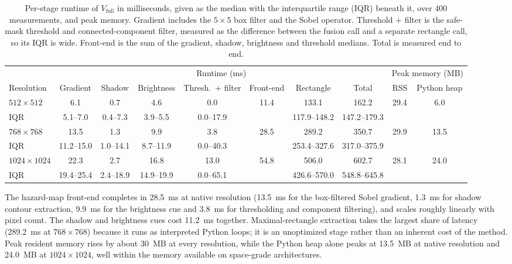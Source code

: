 \documentclass{article}
\begin{document}
\begin{table}[!htb]
  \caption{Per-stage runtime of $V_{\text{full}}$ in milliseconds, given as the median with the interquartile range (IQR) beneath it, over 400 measurements, and peak memory. Gradient includes the $5 \times 5$ box filter and the Sobel operator. Threshold + filter is the safe-mask threshold and connected-component filter, measured as the difference between the fusion call and a separate rectangle call, so its IQR is wide. Front-end is the sum of the gradient, shadow, brightness and threshold medians. Total is measured end to end.}
  \label{tab:runtime_breakdown}
  \centering
  \small
  \setlength{\tabcolsep}{3pt}
  \begin{tabular}{lccccccccc}
    \toprule
    & \multicolumn{7}{c}{Runtime (ms)} & \multicolumn{2}{c}{Peak memory (MB)} \\
    \cmidrule(lr){2-8} \cmidrule(lr){9-10}
    Resolution & Gradient & Shadow & Brightness & Thresh.\ + filter & Front-end & Rectangle & Total & RSS & Python heap \\
    \midrule
    $512 \times 512$ & 6.1 & 0.7 & 4.6 & 0.0 & 11.4 & 133.1 & 162.2 & 29.4 & 6.0 \\
    {\footnotesize\quad IQR} & {\footnotesize 5.1--7.0} & {\footnotesize 0.4--7.3} & {\footnotesize 3.9--5.5} & {\footnotesize 0.0--17.9} & & {\footnotesize 117.9--148.2} & {\footnotesize 147.2--179.3} & & \\
    $768 \times 768$ & 13.5 & 1.3 & 9.9 & 3.8 & 28.5 & 289.2 & 350.7 & 29.9 & 13.5 \\
    {\footnotesize\quad IQR} & {\footnotesize 11.2--15.0} & {\footnotesize 1.0--14.1} & {\footnotesize 8.7--11.9} & {\footnotesize 0.0--40.3} & & {\footnotesize 253.4--327.6} & {\footnotesize 317.0--375.9} & & \\
    $1024 \times 1024$ & 22.3 & 2.7 & 16.8 & 13.0 & 54.8 & 506.0 & 602.7 & 28.1 & 24.0 \\
    {\footnotesize\quad IQR} & {\footnotesize 19.4--25.4} & {\footnotesize 2.4--18.9} & {\footnotesize 14.9--19.9} & {\footnotesize 0.0--65.1} & & {\footnotesize 426.6--570.0} & {\footnotesize 548.8--645.8} & & \\
    \bottomrule
  \end{tabular}
\end{table}

The hazard-map front-end completes in 28.5~ms at native resolution (13.5~ms for the box-filtered Sobel gradient, 1.3~ms for shadow contour extraction, 9.9~ms for the brightness cue and 3.8~ms for thresholding and component filtering), and scales roughly linearly with pixel count. The shadow and brightness cues cost 11.2~ms together. Maximal-rectangle extraction takes the largest share of latency (289.2~ms at $768 \times 768$) because it runs as interpreted Python loops; it is an unoptimized stage rather than an inherent cost of the method. Peak resident memory rises by about 30~MB at every resolution, while the Python heap alone peaks at 13.5~MB at native resolution and 24.0~MB at $1024 \times 1024$, well within the memory available on space-grade architectures.
\end{document}
